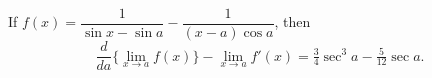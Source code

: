 If
$f(x) = \dfrac{1}{\sin x - \sin a} - \dfrac{1}{(x - a)\cos a}$,
then
\[
\frac{d}{da}\{\lim_{x \to a} f(x)\} - \lim_{x \to a}f'(x)
  = \tfrac{3}{4} \sec^{3} a - \tfrac{5}{12} \sec a.
\]

